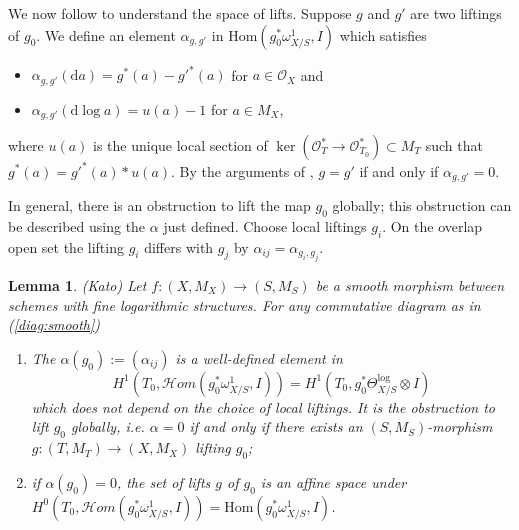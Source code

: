 \documentclass[12pt,twoside]{book}
\theoremstyle{plain}
\newtheorem{lemma}[lemma]{Lemma}
\theoremstyle{definition}
\theoremstyle{remark}
\numberwithin{equation}{section}
\begin{document}
We now follow \cite[Proposition 3.9 on p. 203]{Kat89} to understand the space of lifts. Suppose $g$ and $g'$ are two liftings of $g_0$. We define an element $\alpha_{g,g'}$ in $\mathrm{Hom}(g_0^*\omega^1_{X/S},I)$ which satisfies
\begin{itemize}
\item $\alpha_{g,g'}(\mathrm{d}a) = g^*(a)-g'^*(a)$ for $a\in \mathcal O_X$ and
\item $\alpha_{g,g'}(\mathrm{d}\log a) = u(a) -1$ for $a \in M_X$,
\end{itemize}
where $u(a)$ is the unique local section of $\ker(\mathcal O^*_T \rightarrow \mathcal O^*_{T_0}) \subset M_T$ such that $g^*(a)=g'^*(a)*u(a)$. By the arguments of \cite[p. 203]{Kat89}, $g=g'$ if and only if $\alpha_{g,g'} =0$.

In general, there is an obstruction to lift the map $g_0$ globally; this obstruction can be described using the $\alpha$ just defined. Choose local liftings $g_i$. On the overlap open set the lifting $g_i$ differs with $g_j$ by $\alpha_{ij} = \alpha_{g_i,g_j}$.
\begin{lemma}(Kato) \label{obs:map} Let $f\colon (X,M_X)\rightarrow (S,M_S)$ be a smooth morphism between schemes with fine logarithmic structures. For any commutative diagram as in (\eqref{diag:smooth})
\begin{enumerate}
\item[i.] The $\alpha(g_0):=(\alpha_{ij})$ is a well-defined element in
$$H^1(T_0,\mathcal Hom(g_0^* \omega^1_{X/S},I))=H^1(T_0,g_0^* \Theta^{\log}_{X/S}\otimes I)$$
which does not depend on the choice of local liftings. It is the obstruction to lift $g_0$ globally, i.e. $\alpha=0$ if and only if there exists an $(S,M_S)$-morphism $g:(T,M_T)\rightarrow (X,M_X)$ lifting $g_0$;
\item[ii.] if $\alpha(g_0)=0$, the set of lifts $g$ of $g_0$ is an affine space under $H^0(T_0,\mathcal Hom(g_0^* \omega^1_{X/S},I))=\mathrm{Hom}(g^*_0\omega_{X/S}^1,I)$.
\end{enumerate}

\end{lemma}
\end{document}

